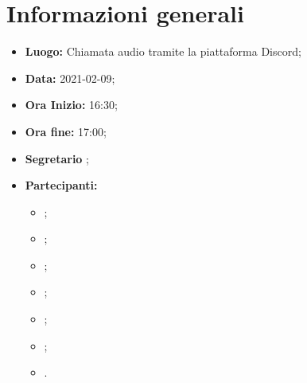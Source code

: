 \section{Informazioni generali}
	\begin{itemize}
		\item \textbf{Luogo:} Chiamata audio tramite la piattaforma Discord;
		\item \textbf{Data:} 2021-02-09;
		\item \textbf{Ora Inizio:} 16:30;
		\item \textbf{Ora fine:} 17:00;
		\item \textbf{Segretario} \VAS;
		\item \textbf{Partecipanti:}
		\begin{itemize}
			\item \MB ;
			\item \VAS ;
			\item \FD ;
			\item \NM ;
			\item \SB ;
			\item \GB ;
			\item \MDI .
		\end{itemize}
		
	\end{itemize}